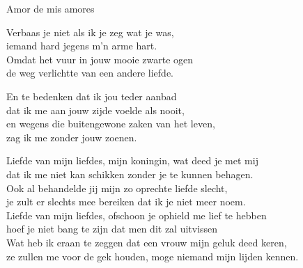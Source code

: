\begin{song}[vals]{Amor de mis amores}

\clearpage
\begin{translation}
Verbaas je niet als ik je zeg wat je was,\\
iemand hard jegens m'n arme hart.\\
Omdat het vuur in jouw mooie zwarte ogen\\
de weg verlichtte van een andere liefde.\vspace{\wlskip}

En te bedenken dat ik jou teder aanbad\\
dat ik me aan jouw zijde voelde als nooit,\\
en wegens die buitengewone zaken van het leven,\\
zag ik me zonder jouw zoenen.\vspace{\wlskip}

Liefde van mijn liefdes, mijn koningin, wat deed je met mij\\
dat ik me niet kan schikken zonder je te kunnen behagen.\\
Ook al behandelde jij mijn zo oprechte liefde slecht,\\
je zult er slechts mee bereiken dat ik je niet meer noem.\\
Liefde van mijn liefdes, ofschoon je ophield me lief te hebben\\
hoef je niet bang te zijn dat men dit zal uitvissen\\
Wat heb ik eraan te zeggen dat een vrouw mijn geluk deed keren,\\
ze zullen me voor de gek houden, moge niemand mijn lijden kennen.
\end{translation}

\end{song}
